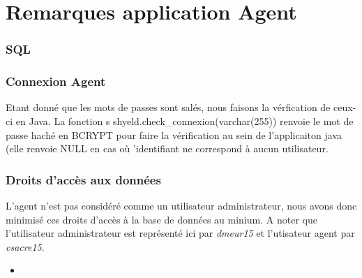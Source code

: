 \documentclass{article}[12pt]
\newcommand{\SQLcode}[2]{
	\begin{itemize}
		\item[]
	\end{itemize}
}
\begin{document}
	
	\section{Remarques application Agent}
	\label{agent}
	\subsubsection{SQL}

	\subsubsection{Connexion Agent}
	Etant donné que les mots de passes sont salés, nous faisons la vérfication de ceux-ci en Java. La fonction s shyeld.check\_connexion(varchar(255)) renvoie le mot de passe haché en BCRYPT pour faire la vérification au sein de l'applicaiton java (elle renvoie NULL en cas où 'identifiant ne correspond à aucun utilisateur.
	\subsubsection{Droits d'accès aux données}
	L'agent n'est pas considéré comme un utilisateur administrateur, nous avons donc minimisé ces droits d'accès à la base de données au minium. A noter que l'utilisateur administrateur est représenté ici par \textit{dmeur15} et l'utisateur agent par \textit{csacre15}.
	\SQLcode{grant}{Droits d'accès à la base de données pour un agent}
	
\end{document}

